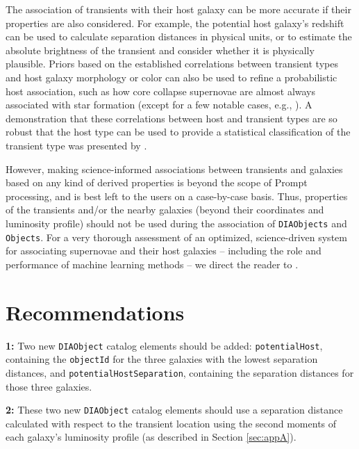 \documentclass[DM,authoryear,toc]{lsstdoc}
\begin{document}
The association of transients with their host galaxy can be more accurate if their properties are also considered.
For example, the potential host galaxy's redshift can be used to calculate separation distances in physical units, or to estimate the absolute brightness of the transient and consider whether it is physically plausible.
Priors based on the established correlations between transient types and host galaxy morphology or color can also be used to refine a probabilistic host association, such as how core collapse supernovae are almost always associated with star formation (except for a few notable cases, e.g., \citealt{2012ApJ...753...68G,2019ApJ...887..127I}).
A demonstration that these correlations between host and transient types are so robust that the host type can be used to provide a statistical classification of the transient type was presented by \citet{2013ApJ...778..167F}.

However, making science-informed associations between transients and galaxies based on any kind of derived properties is beyond the scope of Prompt processing, and is best left to the users on a case-by-case basis. 
Thus, properties of the transients and/or the nearby galaxies (beyond their coordinates and luminosity profile) should not be used during the association of {\tt DIAObjects} and {\tt Objects}.
For a very thorough assessment of an optimized, science-driven system for associating supernovae and their host galaxies -- including the role and performance of machine learning methods -- we direct the reader to \citet{2016AJ....152..154G}.

\section{Recommendations}\label{sec:recs}

\textbf{1: } Two new {\tt DIAObject} catalog elements should be added: {\tt potentialHost}, containing the {\tt objectId} for the three galaxies with the lowest separation distances, and {\tt potentialHostSeparation}, containing the separation distances for those three galaxies.

\textbf{2: } These two new {\tt DIAObject} catalog elements should use a separation distance calculated with respect to the transient location using the second moments of each galaxy's luminosity profile (as described in Section \ref{sec:appA}).
\end{document}
